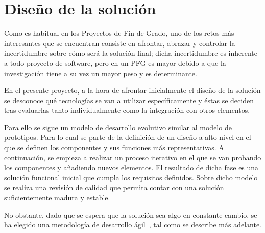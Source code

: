 \chapter{Diseño de la solución}
\par Como es habitual en los Proyectos de Fin de Grado, uno de los retos más interesantes que se encuentran consiste en afrontar, abrazar y controlar la
incertidumbre sobre cómo será la solución final; dicha incertidumbre es inherente a todo proyecto de software, pero en un PFG es mayor debido a que la
investigación tiene a su vez un mayor peso y es determinante.
\par En el presente proyecto, a la hora de afrontar inicialmente el diseño de la solución se desconoce qué tecnologías se van a utilizar específicamente y éstas
se deciden tras evaluarlas tanto individualmente como la integración con otros elementos.
\par Para ello se sigue un modelo de desarrollo evolutivo similar al modelo de prototipos. Para lo cual se parte de la definición de un diseño a alto nivel en
el que se definen los componentes y sus funciones más representativas. A continuación, se empieza a realizar un proceso iterativo en el que se van probando los
componentes y añadiendo nuevos elementos. El resultado de dicha fase es una solución funcional inicial que cumpla los requisitos definidos. Sobre dicho modelo
se realiza una revisión de calidad que permita contar con una solución suficientemente madura y estable.
\par No obstante, dado que se espera que la solución sea algo en constante cambio, se ha elegido una metodología de desarrollo ágil~\cite{wiki:agil}, tal como
se describe más adelante.

